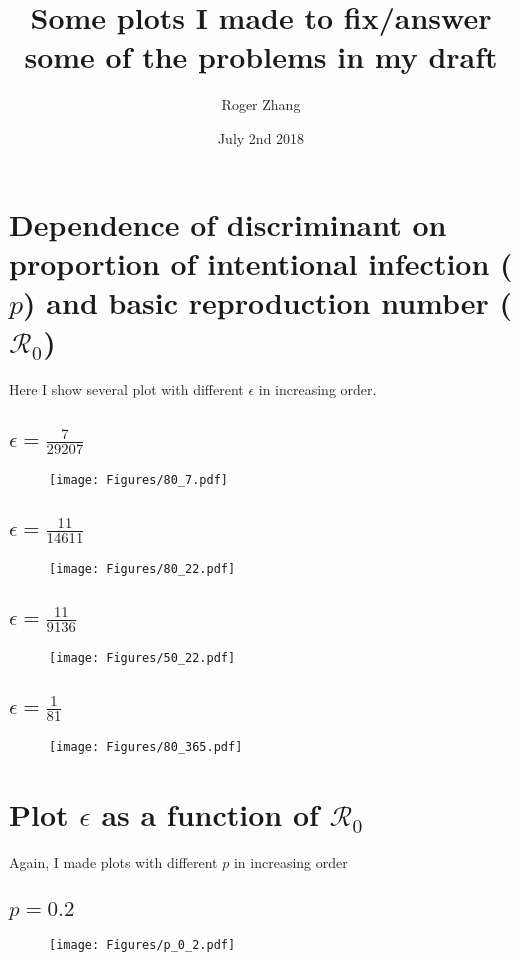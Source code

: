 \documentclass[12pt]{article}
\title{Some plots I made to fix/answer some of the problems in my draft}
\author{Roger Zhang}
\date{July 2nd 2018}
\newcommand{\R}{\mathcal{R}}
\begin{document}
\maketitle
\clearpage
\section{Dependence of discriminant on proportion of intentional infection ($p$) and basic reproduction number ($\R_0$)}

Here I show several plot with different $\epsilon$ in increasing order.
\subsection{$\epsilon=\frac{7}{29207}$}
\begin{figure}[H]
  \centering
  \texttt{[image: Figures/80\_7.pdf]}
\end{figure}

\subsection{$\epsilon=\frac{11}{14611}$}
\begin{figure}[H]
  \centering
  \texttt{[image: Figures/80\_22.pdf]}
\end{figure}

\subsection{$\epsilon=\frac{11}{9136}$}
\begin{figure}[H]
  \centering
  \texttt{[image: Figures/50\_22.pdf]}
\end{figure}

  \subsection{$\epsilon=\frac{1}{81}$}
\begin{figure}[H]
  \centering
  \texttt{[image: Figures/80\_365.pdf]}
\end{figure}
\clearpage

\section{Plot $\epsilon$ as a function of $\R_0$}

Again, I made plots with different $p$ in increasing order
\subsection{$p=0.2$}
\begin{figure}[H]
  \centering
  \texttt{[image: Figures/p\_0\_2.pdf]}
\end{figure}
\end{document}
